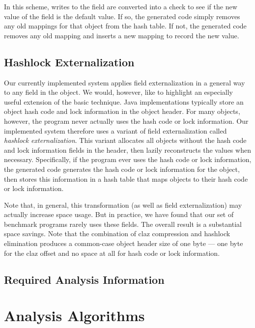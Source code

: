 \documentclass{acmconf}
\begin{document}
In this scheme, writes to the field are converted into a check to see
if the new value of the field is the default value. If so, the 
generated code simply removes any old mappings for that 
object from the hash table.
If not, the generated code removes any old mapping and inserts a new
mapping to record the new value. 

\subsection{Hashlock Externalization}

Our currently implemented system applies field externalization
in a general way to any field in the object. We would, however,
like to highlight an especially useful extension of the basic
technique. Java implementations typically store an object
hash code and lock information in the object header. For many
objects, however, the program never actually uses the hash code
or lock information. Our implemented system therefore uses
a variant of field externalization called {\em hashlock 
externalization}. This variant allocates all objects 
without the hash code and lock information fields in the header,
then lazily reconstructs the values when necessary. 
Specifically, if the program ever uses the hash code or lock information, 
the generated code generates the hash code or lock information
for the object, then stores this information in a hash table
that maps objects to their hash code or lock information. 

Note that, in general, this transformation (as well as field
externalization) may actually increase space usage. But in
practice, we have found that our set of benchmark programs
rarely uses these fields. The overall result is a substantial
space savings. Note that the combination of claz compression 
and hashlock elimination produces a common-case object header
size of one byte --- one byte for the claz offset and no
space at all for hash code or lock information. 

\subsection{Required Analysis Information}

\section{Analysis Algorithms}

\end{document}
